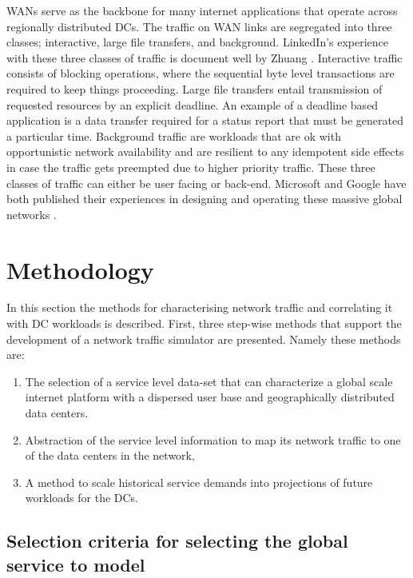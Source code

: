     WANs serve as the backbone for many internet applications that operate across regionally distributed DCs. The traffic on WAN links are segregated into three classes; interactive, large file transfers, and background. LinkedIn’s experience with these three classes of traffic is document well by Zhuang \cite{zhuang15}. Interactive traffic consists of blocking operations, where the sequential byte level transactions are required to keep things proceeding. Large file transfers entail transmission of requested resources by an explicit deadline. An example of a deadline based application is a data transfer required for a status report that must be generated a particular time. Background traffic are workloads that are ok with opportunistic network availability and are resilient to any idempotent side effects in case the traffic gets preempted due to higher priority traffic. These three classes of traffic can either be user facing or back-end. Microsoft and Google have both published their experiences in designing and operating these massive global networks \cite{hong13, sushant13}.  

\section{Methodology} 
    In this section the methods for characterising network traffic and correlating it with DC workloads is described. First, three step-wise methods that support the development of a network traffic simulator are presented. Namely these methods are:
    
    \begin{enumerate}
        \item The selection of a service level data-set that can characterize a global scale internet platform with a dispersed user base and geographically distributed data centers. 
        \item Abstraction of the service level information to map its network traffic to one of the data centers in the network, 
        \item A method to scale historical service demands into projections of future workloads for the DCs.
    \end{enumerate} 
    
    \subsection{Selection criteria for selecting the global service to model}

